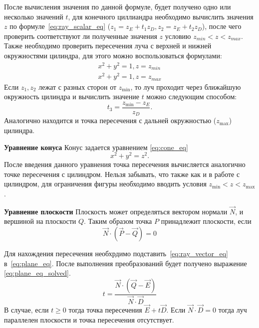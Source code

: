 \documentclass[a4paper,14pt,unknownkeysallowed]{extreport}
\begin{document}
После вычисления значения по данной формуле, будет получено  одно или несколько значений $t$, для конечного циллиандра необходимо вычислить значения $z$ по
формуле~\ref{eq:ray_scalar_eq} ($z_1 = z_E + t_1z_D,z_2 = z_E + t_2z_D$), после чего проверить соответствуют ли полученные значения $z$ условию $z_{min} < z  < z_{max}$.
Также необходимо проверить пересечения луча с верхней и нижней окружностями цилиндра, для этого можно воспользоваться формулами:
\begin{equation}
	\label{eq:cylinder_caps}
	\begin{aligned}
		x^2 + y^2=1,z = z_{min}\\
		x^2 + y^2=1,z = z_{max}
	\end{aligned}
\end{equation}
Если $z_1,z_2$ лежат с разных сторон от $z_{\min}$, то луч проходит через ближайшую окружность цилиндра и вычислить значение $t$ можно следующим способом:
\begin{equation}
	t_3=\frac{z_{\min}-z_E}{z_D}.
	\label{eq:cylinder_caps_solved}
\end{equation}
Аналогично находится и точка пересечения с дальней окружностью ($z_{\max}$) цилиндра.\cite{primitives_raytracing_equations}


\textbf{Уравнение конуса}
Конус задается уравнением \ref{eq:cone_eq}
\begin{equation}
	x^2+y^2=z^2.
	\label{eq:cone_eq}
\end{equation}
После введения данного уравнения точка пересечения вычисляется аналогично точке пересечения с цилиндром. Нельзя забывать, что также как и в работе с цилиндром, для
ограничения фигуры необходимо вводить условия $z_{\min} < z < z_{\max}$.

\textbf{Уравнение плоскости}
Плоскость может определяться вектором нормали $\vec{N}$, и вершиной на плоскости $Q$. Таким образом точка $P$ принадлежит плоскости, если 
\begin{equation}
	\vec{N} \cdot (\vec{P} - \vec{Q}) = 0
	\label{eq:plane_eq}
\end{equation}

Для нахождения пересечения необхрдимо подставить~\ref{eq:ray_vector_eq} в~\ref{eq:plane_eq}. После выполнения преобразований будет получено
выражение \ref{eq:plane_eq_solved}.
\begin{equation}
	t=\frac{\vec{N} \cdot (\vec{Q} - \vec{E})}{\vec{N} \cdot \vec{D}}
	\label{eq:plane_eq_solved}
\end{equation}
В случае, если $t \ge 0$ тогда точка пересечения $\vec{E} + t\vec{D}$. Если $\vec{N} \cdot \vec{D} = 0$ тогда луч параллелен плоскости и
точка пересечения отсутствует.\cite{primitives_raytracing_equations}
\end{document}
